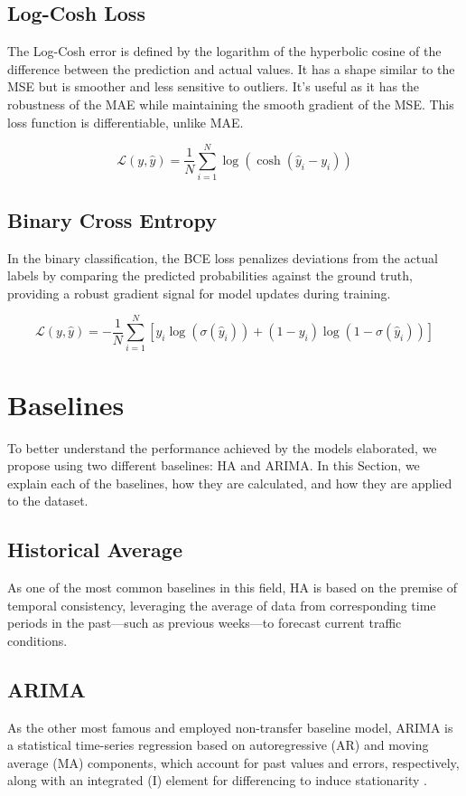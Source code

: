\subsection{Log-Cosh Loss}

The Log-Cosh error is defined by the logarithm of the hyperbolic cosine of the difference between the prediction and actual values. It has a shape similar to the \gls{MSE} but is smoother and less sensitive to outliers. It's useful as it has the robustness of the \gls{MAE} while maintaining the smooth gradient of the \gls{MSE}. This loss function is differentiable, unlike \gls{MAE}.

\begin{equation}
\mathcal{L}(y, \hat{y}) = \frac{1}{N} \sum_{i=1}^{N} \log(\cosh(\hat{y}_i - y_i))
\end{equation}

\subsection{Binary Cross Entropy} \label{ssec:bce}

In the binary classification, the \gls{BCE} loss penalizes deviations from the actual labels by comparing the predicted probabilities against the ground truth, providing a robust gradient signal for model updates during training.

\begin{equation}
\mathcal{L}(y, \hat{y}) = -\frac{1}{N} \sum_{i=1}^{N} [y_{i} \log(\sigma(\hat{y}_{i})) + (1 - y_{i}) \log(1 - \sigma(\hat{y}_{i}))]
\end{equation}


\section{Baselines} \label{sec:baselines}

To better understand the performance achieved by the models elaborated, we propose using two different baselines: \gls{HA} and \gls{ARIMA}. In this Section, we explain each of the baselines, how they are calculated, and how they are applied to the dataset.

\subsection{Historical Average} \label{ssec:ha}

As one of the most common baselines in this field, \gls{HA} is based on the premise of temporal consistency, leveraging the average of data from corresponding time periods in the past—such as previous weeks—to forecast current traffic conditions.


\subsection{ARIMA} \label{ssec:arima}

As the other most famous and employed non-transfer baseline model, \gls{ARIMA} is a statistical time-series regression based on autoregressive (AR) and moving average (MA) components, which account for past values and errors, respectively, along with an integrated (I) element for differencing to induce stationarity \cite{1678242}.